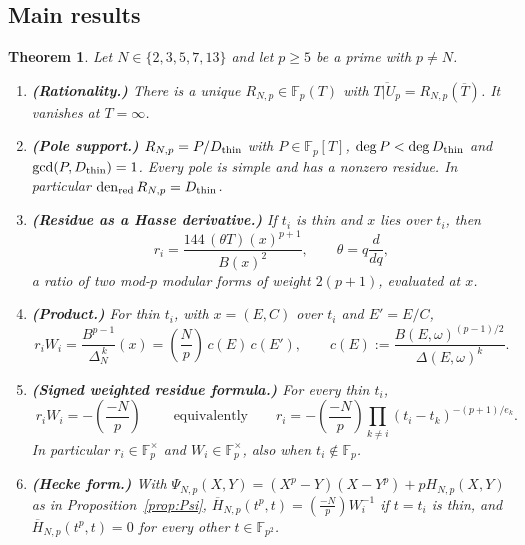 \documentclass[11pt,a4paper]{article}
\numberwithin{equation}{section}
\newtheorem{maintheorem}[theorem]{Theorem}
\theoremstyle{definition}
\theoremstyle{remark}
\newcommand{\Fp}{\mathbb F_p}
\newcommand{\Fq}{\mathbb F_{p^2}}
\newcommand{\den}{\operatorname{den}_{\mathrm{red}}}
\newcommand{\Lp}[1]{\left(\frac{#1}{p}\right)}
\begin{document}
\subsection{Main results}
\begin{maintheorem}\label{thm:main}
Let $N\in\{2,3,5,7,13\}$ and let $p\ge5$ be a prime with $p\ne N$.
\begin{enumerate}[label=\textup{(\alph*)}]
\item \textbf{(Rationality.)} There is a unique $R_{N,p}\in\Fp(T)$ with $\overline{T|U_p}=R_{N,p}(\overline T)$. It vanishes at $T=\infty$.
\item \textbf{(Pole support.)} $R_{N,p}=P/D_{\rm thin}$ with $P\in\Fp[T]$,
$\deg P<\deg D_{\rm thin}$ and $\gcd(P,D_{\rm thin})=1$. Every pole is simple and has a nonzero residue. In particular $\den R_{N,p}=D_{\rm thin}$.
\item \textbf{(Residue as a Hasse derivative.)} If $t_i$ is thin and $x$ lies over $t_i$, then
\[
r_i=\frac{144\,(\theta T)(x)^{p+1}}{B(x)^2},\qquad \theta=q\frac{d}{dq},
\]
a ratio of two mod-$p$ modular forms of weight $2(p+1)$, evaluated at $x$.
\item \textbf{(Product.)} For thin $t_i$, with $x=(E,C)$ over $t_i$ and $E'=E/C$,
\[
r_iW_i=\frac{B^{p-1}}{\Delta_N^{\,k}}(x)=\Lp{N}\,c(E)\,c(E'),\qquad
c(E):=\frac{B(E,\omega)^{(p-1)/2}}{\Delta(E,\omega)^{k}}.
\]
\item \textbf{(Signed weighted residue formula.)} For every thin $t_i$,
\[
\boxed{\;r_iW_i=-\Lp{-N}\;}\qquad\text{equivalently}\qquad
r_i=-\Lp{-N}\prod_{k\ne i}(t_i-t_k)^{-(p+1)/e_k}.
\]
In particular $r_i\in\Fp^\times$ and $W_i\in\Fp^\times$, also when $t_i\notin\Fp$.
\item \textbf{(Hecke form.)} With $\Psi_{N,p}(X,Y)=(X^p-Y)(X-Y^p)+pH_{N,p}(X,Y)$ as in
Proposition~\ref{prop:Psi}, $\overline H_{N,p}(t^p,t)=\Lp{-N}W_i^{-1}$ if $t=t_i$ is thin, and
$\overline H_{N,p}(t^p,t)=0$ for every other $t\in\Fq$.
\end{enumerate}
\end{maintheorem}
\end{document}
